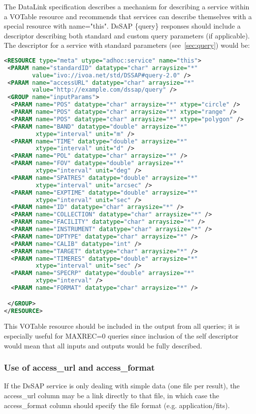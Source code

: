 \documentclass[11pt,a4paper]{ivoa}
\begin{document}
The DataLink specification describes a mechanism for describing a service within a VOTable resource and recommends that services can describe themselves with a special resource with name="this". DsSAP \{query\} responses should include a descriptor describing both standard and custom query parameters (if applicable). The descriptor for a service with standard parameters (see~\ref{sec:query}) would be:
\begin{lstlisting}[language=XML]
<RESOURCE type="meta" utype="adhoc:service" name="this">
 <PARAM name="standardID" datatype="char" arraysize="*"
        value="ivo://ivoa.net/std/DSSAP#query-2.0" />
 <PARAM name="accessURL" datatype="char" arraysize="*"
        value="http://example.com/dssap/query" />
 <GROUP name="inputParams">
  <PARAM name="POS" datatype="char" arraysize="*" xtype="circle" />
  <PARAM name="POS" datatype="char" arraysize="*" xtype="range" />
  <PARAM name="POS" datatype="char" arraysize="*" xtype="polygon" />
  <PARAM name="BAND" datatype="double" arraysize="*" 
         xtype="interval" unit="m" />
  <PARAM name="TIME" datatype="double" arraysize="*" 
         xtype="interval" unit="d" />
  <PARAM name="POL" datatype="char" arraysize="*" />
  <PARAM name="FOV" datatype="double" arraysize="*" 
         xtype="interval" unit="deg" />
  <PARAM name="SPATRES" datatype="double" arraysize="*" 
         xtype="interval" unit="arcsec" />
  <PARAM name="EXPTIME" datatype="double" arraysize="*" 
         xtype="interval" unit="sec" />
  <PARAM name="ID" datatype="char" arraysize="*" />
  <PARAM name="COLLECTION" datatype="char" arraysize="*" />
  <PARAM name="FACILITY" datatype="char" arraysize="*" />
  <PARAM name="INSTRUMENT" datatype="char" arraysize="*" />
  <PARAM name="DPTYPE" datatype="char" arraysize="*" />
  <PARAM name="CALIB" datatype="int" />
  <PARAM name="TARGET" datatype="char" arraysize="*" />
  <PARAM name="TIMERES" datatype="double" arraysize="*" 
         xtype="interval" unit="sec" />
  <PARAM name="SPECRP" datatype="double" arraysize="*" 
         xtype="interval" />
  <PARAM name="FORMAT" datatype="char" arraysize="*" />

 </GROUP>
</RESOURCE>

\end{lstlisting}
This VOTable resource should be included in the output from all queries; it is especially useful for MAXREC=0 queries since inclusion of the self descriptor would mean that all inputs and outputs would be fully described.




\subsubsection{Use of access\_url and access\_format}
If the DsSAP service is only dealing with simple data (one file per result), the access\_url column may be a link directly to that file, in which case the access\_format column should specify the file format (e.g. application/fits). 
\end{document}
